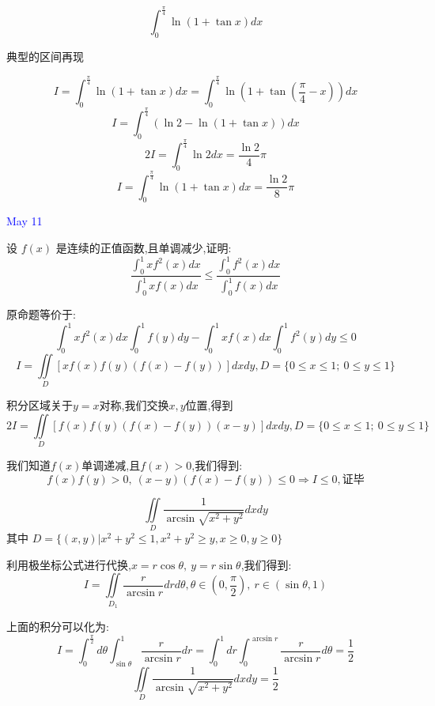 \begin{example}[][Exam: 31.2.6]
	$$\int_{0}^{\frac{\pi}{4}}\ln(1+\tan x)dx$$
\end{example}

\begin{solution}
	
	典型的区间再现
	
	$$I=\int_{0}^{\frac{\pi}{4}}\ln(1+\tan x)dx=\int_{0}^{\frac{\pi}{4}}\ln(1+\tan(\frac{\pi}{4}-x))dx$$
	$$I=\int_{0}^{\frac{\pi}{4}}(\ln2-\ln(1+\tan x))dx$$
	$$2I=\int_{0}^{\frac{\pi}{4}}\ln 2dx=\frac{\ln 2}{4}\pi$$
	$$I=\int_{0}^{\frac{\pi}{4}}\ln(1+\tan x)dx=\frac{\ln 2}{8}\pi$$
\end{solution}


\textcolor{blue}{May 11}

\begin{example}[][Exam: 31.2.7]
	设 $f(x)$ 是连续的正值函数,且单调减少,证明:
	$$\dfrac{\int_{0}^{1}xf^{2}(x)dx}{\int_{0}^{1}xf(x)dx}\leq \dfrac{\int_{0}^{1}f^{2}(x)dx}{\int_{0}^{1}f(x)dx}$$
\end{example}

\begin{solution}
	
	原命题等价于: 
	$$\int_{0}^{1}xf^{2}(x)dx\int_{0}^{1}f(y)dy-\int_{0}^{1}xf(x)dx\int_{0}^{1}f^{2}(y)dy\leq 0$$
	$$I=\iint\limits_{D}[xf(x)f(y)(f(x)-f(y))]dxdy,D=\{0\leq x\leq 1;\ 0\leq y\leq 1 \}$$
	
	积分区域关于$y=x$对称,我们交换$x,y$位置,得到
	$$2I=\iint\limits_{D}[f(x)f(y)(f(x)-f(y))(x-y)]dxdy,D=\{0\leq x\leq 1;\ 0\leq y\leq 1 \}$$
	
	我们知道$f(x)$单调递减,且$f(x)>0$,我们得到: 
	$$f(x)f(y)>0,\ (x-y)(f(x)-f(y))\leq 0\Rightarrow I\leq 0,\text{证毕}$$
\end{solution}

\begin{example}[][Exam: 31.2.8]
	$$\iint\limits_{D}\dfrac{1}{\arcsin\sqrt{x^2+y^2}}dxdy$$
	其中 $D=\{(x,y)|x^2+y^2\leq 1, x^2+y^2\geq y, x\geq 0, y\geq 0\}$
\end{example}

\begin{solution}
	
	利用极坐标公式进行代换,$x=r\cos \theta,\ y=r\sin \theta$,我们得到: 
	$$I=\iint\limits_{D_{1}}\dfrac{r}{\arcsin r}drd\theta,\theta\in(0,\frac{\pi}{2}),\ r\in(\sin\theta,1)$$
	
	上面的积分可以化为: 
	$$I=\int_{0}^{\frac{\pi}{2}}d\theta\int_{\sin\theta}^{1}\dfrac{r}{\arcsin r}dr=\int_{0}^{1}dr\int_{0}^{\arcsin r}\frac{r}{\arcsin r}d\theta=\frac{1}{2}$$
	$$\iint\limits_{D}\dfrac{1}{\arcsin\sqrt{x^2+y^2}}dxdy=\frac{1}{2}$$
\end{solution}


